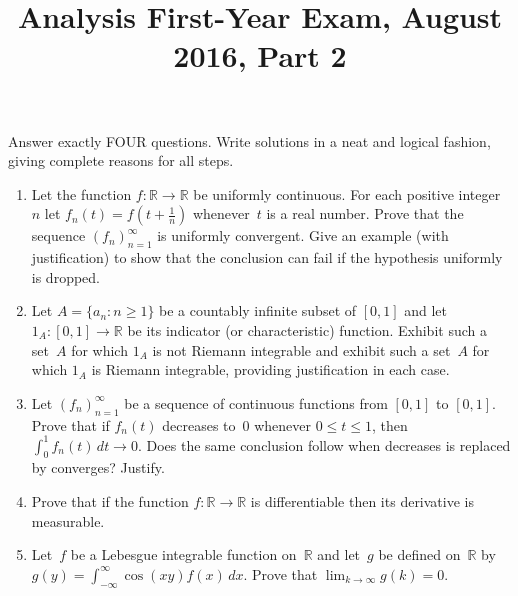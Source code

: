 \documentclass[11pt,letterpaper]{article}
\title{Analysis First-Year Exam, August 2016, Part 2}
\author{}
\date{}
\newenvironment{examproblems}[2]{%
  \def\ProblemHeadingTag{#2}%
  \AssignTaggingSocketPlug{block/list/label}{examproblem}%
  \begin{enumerate}%
  \setcounter{enumi}{#1}%
  \renewcommand{\labelenumi}{\textbf{\theenumi.}}%
  \setlength{\topsep}{0.35em}%
  \setlength{\partopsep}{0pt}%
  \setlength{\itemsep}{0.48em}%
  \setlength{\parsep}{0.18em}%
}{\end{enumerate}}
\newenvironment{examinstructions}{%
  \par\begingroup\itshape
}{%
  \par\endgroup\vspace{0.18em}
}
\begin{document}
\maketitle
\thispagestyle{empty}
\begin{examinstructions}
Answer exactly FOUR questions. Write solutions in a neat and logical fashion, giving complete reasons for all steps.
\end{examinstructions}
\begin{examproblems}{0}{H2}
\def\ProblemHeadingText{Problem 1.}
\item
Let the function \(f:\mathbb{R}\to\mathbb{R}\) be uniformly continuous. For each positive integer~\(n\) let \(f_n(t)=f\!\left(t+\frac{1}{n}\right)\) whenever~\(t\) is a real number. Prove that the sequence \((f_n)_{n=1}^{\infty}\) is uniformly convergent. Give an example (with justification) to show that the conclusion can fail if the hypothesis uniformly is dropped.
\def\ProblemHeadingText{Problem 2.}
\item
Let \(A=\{a_n:n\geq 1\}\) be a countably infinite subset of \([0,1]\) and let \(1_A:[0,1]\to\mathbb{R}\) be its indicator (or characteristic) function. Exhibit such a set~\(A\) for which \(1_A\) is not Riemann integrable and exhibit such a set~\(A\) for which \(1_A\) is Riemann integrable, providing justification in each case.
\def\ProblemHeadingText{Problem 3.}
\item
Let \((f_n)_{n=1}^{\infty}\) be a sequence of continuous functions from \([0,1]\) to \([0,1]\). Prove that if \(f_n(t)\) decreases to~\(0\) whenever \(0\leq t\leq 1\), then \(\int_0^1 f_n(t)\,dt\to 0\). Does the same conclusion follow when decreases is replaced by converges? Justify.
\def\ProblemHeadingText{Problem 4.}
\item
Prove that if the function \(f:\mathbb{R}\to\mathbb{R}\) is differentiable then its derivative is measurable.
\def\ProblemHeadingText{Problem 5.}
\item
Let~\(f\) be a Lebesgue integrable function on~\(\mathbb{R}\) and let~\(g\) be defined on~\(\mathbb{R}\) by \(g(y)=\int_{-\infty}^{\infty}\cos(xy)f(x)\,dx\). Prove that \(\lim_{k\to\infty}g(k)=0\).
\end{examproblems}
\end{document}
